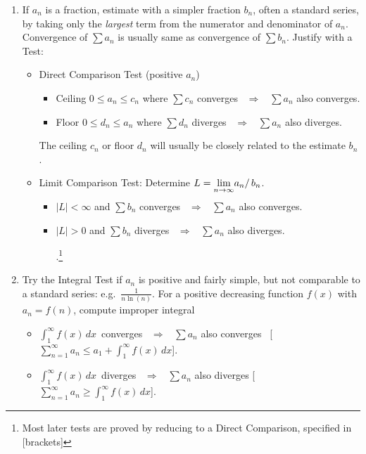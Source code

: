 \documentclass[11pt]{article}
\begin{document}
\begin{enumerate}
\item If $a_n$ is a fraction, estimate with a simpler fraction $b_n$, 
often a standard series, by taking only the {\it largest} term from the numerator
and denominator of $a_n$.
\\
Convergence of $\sum a_n$ is usually same as convergence of $\sum b_n$.  
Justify with a Test:
\\[-1.5em]
\begin{itemize}
\item Direct Comparison Test (positive $a_n$)
\begin{itemize}
\item[$\circ$]  Ceiling $0\leq a_n\leq c_n$ where $\sum c_n$ converges \ $\Longrightarrow$ \ $\sum a_n$ also converges.
\item[$\circ$]   Floor $0\leq d_n\leq a_n$ where $\sum d_n$ diverges \ $\Longrightarrow$ \ $\sum a_n$ also diverges.
\end{itemize}
The ceiling $c_n$ or floor $d_n$ will usually be closely related to the estimate $b_n$.
\smallskip
\item Limit Comparison Test: 
Determine $L=\smash{\lim\limits_{n\to\infty}}a_n/\,b_n$. 
\begin{itemize}
\item[$\circ$] $|L|<\infty$ and $\sum b_n$ converges  \ $\Longrightarrow$ \ $\sum a_n$ also converges.

\item[$\circ$]  $|L|>0$ and $\sum b_n$ diverges \ $\Longrightarrow$ \ $\sum a_n$ also diverges. \smallskip

.\footnote{
Most later tests are proved by reducing to a Direct Comparison, specified in [brackets]}
\end{itemize}
\end{itemize}

\item 
Try the Integral Test if $a_n$ is positive and fairly simple, but not comparable to a standard series: e.g.~$\frac{1}{n\ln(n)}$.
For a positive decreasing function $f(x)$ with $a_n=f(n)$, 
compute  improper integral 
\begin{itemize}
\item[$\circ$] $\int_1^\infty\!f(x)\,dx$\, converges  \ $\Longrightarrow$ \ $\sum a_n$ also converges \  
[$\sum_{n=1}^\infty a_n\leq a_1+\int_1^\infty\! f(x)\,dx$].
\item[$\circ$] $\int_1^\infty\! f(x)\,dx$\, diverges  \ $\Longrightarrow$ \ $\sum a_n$ also diverges 
[$\sum_{n=1}^\infty a_n\geq \int_1^\infty\! f(x)\,dx$].
\end{itemize}



\end{enumerate}
\end{document}
